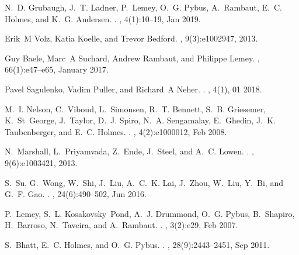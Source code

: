 \documentclass[webpdf,contemporary,large,single]{oup-authoring-template}%
\theoremstyle{thmstyleone}%
\theoremstyle{thmstyletwo}%
\theoremstyle{thmstylethree}%
\begin{document}
\begin{thebibliography}{10}

N.~D. Grubaugh, J.~T. Ladner, P.~Lemey, O.~G. Pybus, A.~Rambaut, E.~C. Holmes,
  and K.~G. Andersen.
.
, 4(1):10--19, Jan 2019.

Erik~M Volz, Katia Koelle, and Trevor Bedford.
, 9(3):e1002947, 2013.

Guy Baele, Marc~A Suchard, Andrew Rambaut, and Philippe Lemey.
, 66(1):e47--e65, January 2017.

Pavel Sagulenko, Vadim Puller, and Richard~A Neher.
.
, 4(1), 01 2018.

M.~I. Nelson, C.~Viboud, L.~Simonsen, R.~T. Bennett, S.~B. Griesemer,
  K.~St~George, J.~Taylor, D.~J. Spiro, N.~A. Sengamalay, E.~Ghedin, J.~K.
  Taubenberger, and E.~C. Holmes.
.
, 4(2):e1000012, Feb 2008.

N.~Marshall, L.~Priyamvada, Z.~Ende, J.~Steel, and A.~C. Lowen.
.
, 9(6):e1003421, 2013.

S.~Su, G.~Wong, W.~Shi, J.~Liu, A.~C.~K. Lai, J.~Zhou, W.~Liu, Y.~Bi, and G.~F.
  Gao.
.
, 24(6):490--502, Jun 2016.

P.~Lemey, S.~L. Kosakovsky~Pond, A.~J. Drummond, O.~G. Pybus, B.~Shapiro,
  H.~Barroso, N.~Taveira, and A.~Rambaut.
.
, 3(2):e29, Feb 2007.

S.~Bhatt, E.~C. Holmes, and O.~G. Pybus.
.
, 28(9):2443--2451, Sep 2011.


\end{thebibliography}
\end{document}
